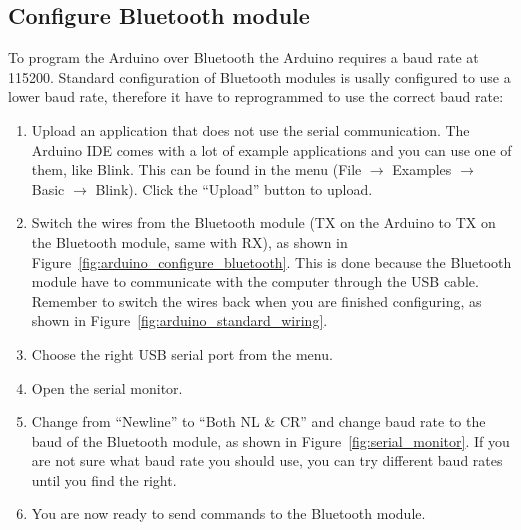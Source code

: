 				
		\subsection{Configure Bluetooth module}
		To program the Arduino over Bluetooth the Arduino requires a baud rate at 115200. Standard configuration of Bluetooth modules is usally configured to use a lower baud rate, therefore it have to reprogrammed to use the correct baud rate:\\
		
		\begin{enumerate}
		\item Upload an application that does not use the serial communication. The Arduino IDE comes with a lot of example applications and you can use one of them, like Blink. This can be found in the menu (File $\rightarrow$ Examples $\rightarrow$ Basic $\rightarrow$ Blink). Click the ``Upload'' button to upload.
		
		\item Switch the wires from the Bluetooth module (TX on the Arduino to TX on the Bluetooth module, same with RX), as shown in Figure~\ref{fig:arduino_configure_bluetooth}. This is done because the Bluetooth module have to communicate with the computer through the USB cable. Remember to switch the wires back when you are finished configuring, as shown in Figure~\ref{fig:arduino_standard_wiring}.
		
		\item Choose the right USB serial port from the menu.
		
		\item Open the serial monitor.
		
		\item Change from ``Newline'' to ``Both NL \& CR'' and change baud rate to the baud of the Bluetooth module, as shown in Figure~\ref{fig:serial_monitor}. If you are not sure what baud rate you should use, you can try different baud rates until you find the right.
		
		\item You are now ready to send commands to the Bluetooth module.
		\end{enumerate}
		

